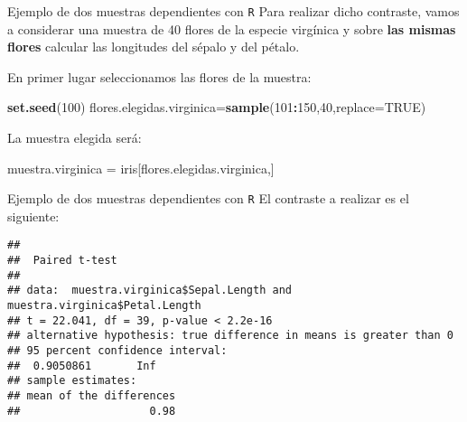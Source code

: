 \documentclass[
  ignorenonframetext,
]{beamer}
\newenvironment{Shaded}{\begin{snugshade}}{\end{snugshade}}
\newcommand{\DataTypeTok}[1]{\textcolor[rgb]{0.13,0.29,0.53}{#1}}
\newcommand{\DecValTok}[1]{\textcolor[rgb]{0.00,0.00,0.81}{#1}}
\newcommand{\KeywordTok}[1]{\textcolor[rgb]{0.13,0.29,0.53}{\textbf{#1}}}
\newcommand{\NormalTok}[1]{#1}
\newcommand{\OperatorTok}[1]{\textcolor[rgb]{0.81,0.36,0.00}{\textbf{#1}}}
\newcommand{\OtherTok}[1]{\textcolor[rgb]{0.56,0.35,0.01}{#1}}
\newcommand{\StringTok}[1]{\textcolor[rgb]{0.31,0.60,0.02}{#1}}
\begin{document}
\begin{frame}[fragile]{Ejemplo de dos muestras dependientes con
\texttt{R}}
\protect\hypertarget{ejemplo-de-dos-muestras-dependientes-con-r-1}{}
Para realizar dicho contraste, vamos a considerar una muestra de 40
flores de la especie virgínica y sobre \textbf{las mismas flores}
calcular las longitudes del sépalo y del pétalo.

En primer lugar seleccionamos las flores de la muestra:

\begin{Shaded}
\begin{Highlighting}[]
\KeywordTok{set.seed}\NormalTok{(}\DecValTok{100}\NormalTok{)}
\NormalTok{flores.elegidas.virginica=}\KeywordTok{sample}\NormalTok{(}\DecValTok{101}\OperatorTok{:}\DecValTok{150}\NormalTok{,}\DecValTok{40}\NormalTok{,}\DataTypeTok{replace=}\OtherTok{TRUE}\NormalTok{)}
\end{Highlighting}
\end{Shaded}

La muestra elegida será:

\begin{Shaded}
\begin{Highlighting}[]
\NormalTok{muestra.virginica =}\StringTok{ }\NormalTok{iris[flores.elegidas.virginica,]}
\end{Highlighting}
\end{Shaded}
\end{frame}

\begin{frame}[fragile]{Ejemplo de dos muestras dependientes con
\texttt{R}}
\protect\hypertarget{ejemplo-de-dos-muestras-dependientes-con-r-2}{}
El contraste a realizar es el siguiente:

\begin{Shaded}
\end{Shaded}

\begin{verbatim}
## 
##  Paired t-test
## 
## data:  muestra.virginica$Sepal.Length and muestra.virginica$Petal.Length
## t = 22.041, df = 39, p-value < 2.2e-16
## alternative hypothesis: true difference in means is greater than 0
## 95 percent confidence interval:
##  0.9050861       Inf
## sample estimates:
## mean of the differences 
##                    0.98
\end{verbatim}
\end{frame}
\end{document}

